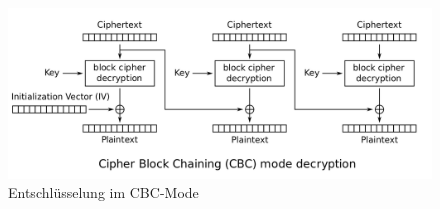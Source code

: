 \documentclass[a4paper,10pt]{scrartcl}
\begin{document}
    \begin{figure}[h]
        \begin{center}
            \includegraphics[width=12cm]{./Literatur/documents/CBC_decryption}\newline\caption{Entschlüsselung im CBC-Mode~\cite{CBC-entschluesseln}}
            \label{CBC_Mode_brechen}
        \end{center}
    \end{figure}
\end{document}
